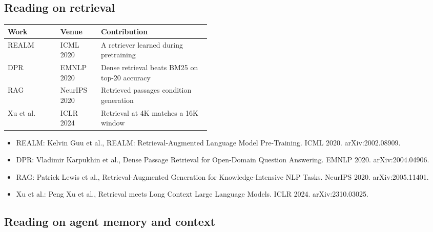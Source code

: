 \subsection{Reading on retrieval}
\label{sec:it-R-retrieval}

\begin{center}\footnotesize
\begin{tabularx}{\linewidth}{L{0.26\linewidth}L{0.2\linewidth}X}
\toprule
\textbf{Work} & \textbf{Venue} & \textbf{Contribution} \\
\midrule
REALM & ICML 2020 & A retriever learned during pretraining \\
DPR & EMNLP 2020 & Dense retrieval beats BM25 on top-20 accuracy \\
RAG & NeurIPS 2020 & Retrieved passages condition generation \\
Xu et al. & ICLR 2024 & Retrieval at 4K matches a 16K window \\
\bottomrule
\end{tabularx}
\end{center}

\begin{itemize}[leftmargin=*]
\item REALM: Kelvin Guu et al., REALM: Retrieval-Augmented Language Model Pre-Training. ICML 2020. arXiv:2002.08909.
\item DPR: Vladimir Karpukhin et al., Dense Passage Retrieval for Open-Domain Question Answering. EMNLP 2020. arXiv:2004.04906.
\item RAG: Patrick Lewis et al., Retrieval-Augmented Generation for Knowledge-Intensive NLP Tasks. NeurIPS 2020. arXiv:2005.11401.
\item Xu et al.: Peng Xu et al., Retrieval meets Long Context Large Language Models. ICLR 2024. arXiv:2310.03025.
\end{itemize}

\subsection{Reading on agent memory and context}
\label{sec:it-R-agents}

